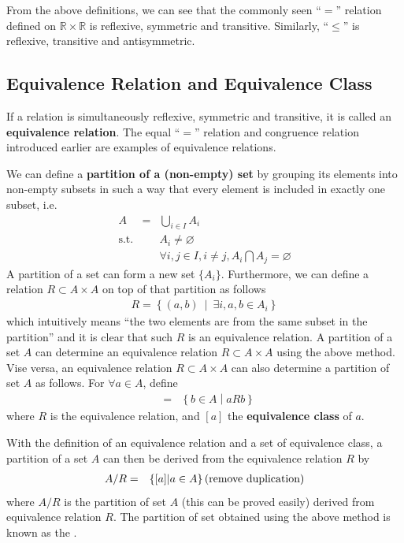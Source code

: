 From the above definitions, we can see that the commonly seen ``$=$'' relation defined on $\mathbb{R}\times\mathbb{R}$ is reflexive, symmetric and transitive. Similarly, ``$\leq$'' is reflexive, transitive and antisymmetric.

\subsection{Equivalence Relation and Equivalence Class}

If a relation is simultaneously reflexive, symmetric and transitive, it is called an \textbf{equivalence relation}. The equal ``$=$'' relation and congruence relation introduced earlier are examples of equivalence relations.

We can define a \textbf{partition of a (non-empty) set} by grouping its elements into non-empty subsets in such a way that every element is included in exactly one subset, i.e.
\begin{eqnarray}
	A &=& \bigcup_{i\in I}A_i \nonumber \\
	\mathrm{s.t.} && A_i \neq \varnothing \nonumber \\
	&& \forall i, j \in I, i\neq j, A_i \bigcap A_j = \varnothing \nonumber
\end{eqnarray}
A partition of a set can form a new set $\{A_i\}$. Furthermore, we can define a relation $R\subset A \times A$ on top of that partition as follows
\begin{eqnarray}
	R = \left\{(a,b)~\middle|~\exists i, a,b \in A_i\right\} \nonumber
\end{eqnarray}
which intuitively means ``the two elements are from the same subset in the partition'' and it is clear that such $R$ is an equivalence relation. A partition of a set $A$ can determine an equivalence relation $R\subset A\times A$ using the above method. Vise versa, an equivalence relation $R\subset A\times A$ can also determine a partition of set $A$ as follows. For $\forall a \in A$, define
\begin{eqnarray}
	[a] &=& \left\{b \in A\middle| aRb \right\} \nonumber
\end{eqnarray}
where $R$ is the equivalence relation, and $[a]$ the \textbf{equivalence class} of $a$. 

With the definition of an equivalence relation and a set of equivalence class, a partition of a set $A$ can then be derived from the equivalence relation $R$ by
\begin{eqnarray}
	A/R &=& \left\{[a] | a \in A \right\} \textup{(remove duplication)} \label{eq:quotient_set}
\end{eqnarray}
where $A/R$ is the partition of set $A$ (this can be proved easily) derived from equivalence relation $R$. The partition of set obtained using the above method is known as the . 

